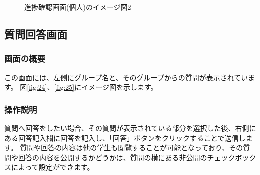 \begin{figure}[htbp]
\begin{minipage}{0.5\hsize}
\begin{center}
  \end{center}
  \caption{進捗確認画面(個人)のイメージ図2}\label{fig:23}
 \end{minipage}
\end{figure}

\newpage

\subsection{質問回答画面}
\subsubsection{画面の概要}
この画面には、左側にグループ名と、そのグループからの質問が表示されています。
図\ref{fig:24}、\ref{fig:25}にイメージ図を示します。

\subsubsection{操作説明}
質問へ回答をしたい場合、その質問が表示されている部分を選択した後、右側にある回答記入欄に回答を記入し、「回答」ボタンをクリックすることで送信します。
質問や回答の内容は他の学生も閲覧することが可能となっており、その質問や回答の内容を公開するかどうかは、質問の横にある非公開のチェックボックスによって設定ができます。



